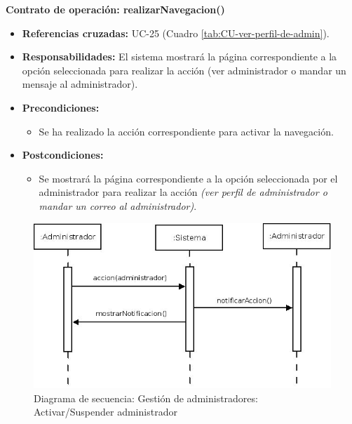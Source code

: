 \textbf{Contrato de operación: realizarNavegacion()}
\begin{itemize}
\item \textbf{Referencias cruzadas:} UC-25 (Cuadro \ref{tab:CU-ver-perfil-de-admin}).
\item \textbf{Responsabilidades:} El sistema mostrará la página correspondiente a la opción seleccionada para realizar la acción (ver administrador o mandar un mensaje al administrador).
\item \textbf{Precondiciones:} 
 \begin{itemize}
\item Se ha realizado la acción correspondiente para activar la navegación.
\end {itemize}
\item \textbf{Postcondiciones:} 
 \begin{itemize}
\item Se mostrará la página correspondiente a la opción seleccionada por el administrador para realizar la acción \textit{(ver perfil de administrador o mandar un correo al administrador)}.
\end {itemize}
\end {itemize}

\vspace{10mm}

\begin{figure}[H]
\centering
  \includegraphics[scale=.50]{img/secuencias/gestion-administradores-activar-suspender.jpeg}
  \caption{Diagrama de secuencia: Gestión de administradores: Activar/Suspender administrador}
  \label{fig:secuencia-gestion-administradores-activar-suspender}
\end{figure}

